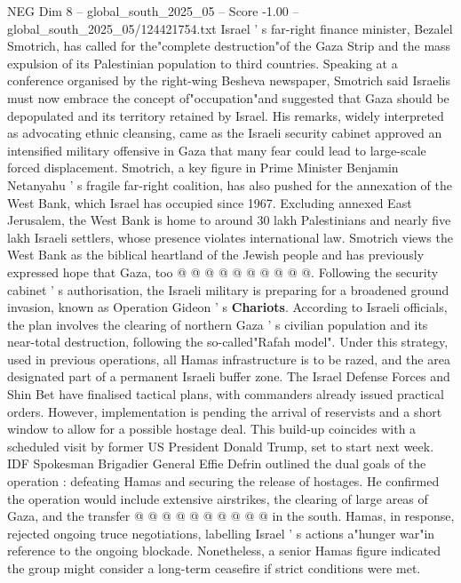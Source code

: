 \begin{textsample}{NEG Dim 8 – global\_south\_2025\_05 – Score -1.00 – global\_south\_2025\_05/124421754.txt}  \label{ex:f8_neg_018}
Israel ' s far-right finance minister, Bezalel Smotrich, has called for the"complete destruction"of the Gaza Strip and the mass expulsion of its Palestinian population to third countries.
Speaking at a conference organised by the right-wing Besheva newspaper, Smotrich said Israelis must now embrace the concept of"occupation"and suggested that Gaza should be depopulated and its territory retained by Israel.
His remarks, widely interpreted as advocating ethnic cleansing, came as the Israeli security cabinet approved an intensified military offensive in Gaza that many fear could lead to large-scale forced displacement.
Smotrich, a key figure in Prime Minister Benjamin Netanyahu ' s fragile far-right coalition, has also pushed for the annexation of the West Bank, which Israel has occupied since 1967.
Excluding annexed East Jerusalem, the West Bank is home to around 30 lakh Palestinians and nearly five lakh Israeli settlers, whose presence violates international law.
Smotrich views the West Bank as the biblical heartland of the Jewish people and has previously expressed hope that Gaza, too @ @ @ @ @ @ @ @ @ @.
Following the security cabinet ' s authorisation, the Israeli military is preparing for a broadened ground invasion, known as Operation Gideon ' s \textbf{Chariots}.
According to Israeli officials, the plan involves the clearing of northern Gaza ' s civilian population and its near-total destruction, following the so-called"Rafah model".
Under this strategy, used in previous operations, all Hamas infrastructure is to be razed, and the area designated part of a permanent Israeli buffer zone.
The Israel Defense Forces and Shin Bet have finalised tactical plans, with commanders already issued practical orders.
However, implementation is pending the arrival of reservists and a short window to allow for a possible hostage deal.
This build-up coincides with a scheduled visit by former US President Donald Trump, set to start next week.
IDF Spokesman Brigadier General Effie Defrin outlined the dual goals of the operation : defeating Hamas and securing the release of hostages.
He confirmed the operation would include extensive airstrikes, the clearing of large areas of Gaza, and the transfer @ @ @ @ @ @ @ @ @ @ in the south.
Hamas, in response, rejected ongoing truce negotiations, labelling Israel ' s actions a"hunger war"in reference to the ongoing blockade.
Nonetheless, a senior Hamas figure indicated the group might consider a long-term ceasefire if strict conditions were met.

\end{textsample}
